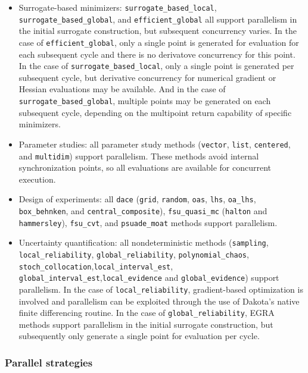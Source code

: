 \begin{itemize}
\item Surrogate-based minimizers: \texttt{surrogate\_based\_local},
  \texttt{surrogate\_based\_global}, and \texttt{efficient\_global}
  all support parallelism in the initial surrogate construction, but
  subsequent concurrency varies.  In the case of
  \texttt{efficient\_global}, only a single point is generated for
  evaluation for each subsequent cycle and there is no derivatove
  concurrency for this point.  In the case of
  \texttt{surrogate\_based\_local}, only a single point is generated
  per subsequent cycle, but derivative concurrency for numerical
  gradient or Hessian evaluations may be available.  And in the case
  of \texttt{surrogate\_based\_global}, multiple points may be
  generated on each subsequent cycle, depending on the multipoint
  return capability of specific minimizers.

\item Parameter studies: all parameter study methods (\texttt{vector},
  \texttt{list}, \texttt{centered}, and \texttt{multidim}) support
  parallelism. These methods avoid internal synchronization points, so
  all evaluations are available for concurrent execution.

\item Design of experiments: all \texttt{dace} (\texttt{grid},
  \texttt{random}, \texttt{oas}, \texttt{lhs}, \texttt{oa\_lhs},
  \texttt{box\_behnken}, and \texttt{central\_composite}),
  \texttt{fsu\_quasi\_mc} (\texttt{halton} and \texttt{hammersley}),
  \texttt{fsu\_cvt}, and \texttt{psuade\_moat} methods support
  parallelism.

\item Uncertainty quantification: all nondeterministic methods
  (\texttt{sampling}, \texttt{local\_reliability},
  \texttt{global\_reliability}, \texttt{polynomial\_chaos},
  \texttt{stoch\_collocation},\texttt{local\_interval\_est}, 
  \texttt{global\_interval\_est},\texttt{local\_evidence} and 
  \texttt{global\_evidence})
  support parallelism. In the case of
  \texttt{local\_reliability}, gradient-based optimization is
  involved and parallelism can be exploited through the use of
  Dakota's native finite differencing routine.  In the case of
  \texttt{global\_reliability}, EGRA methods support parallelism
  in the initial surrogate construction, but subsequently only
  generate a single point for evaluation per cycle.
\end{itemize}

\subsubsection{Parallel strategies}\label{parallel:algorithms:strategies}


